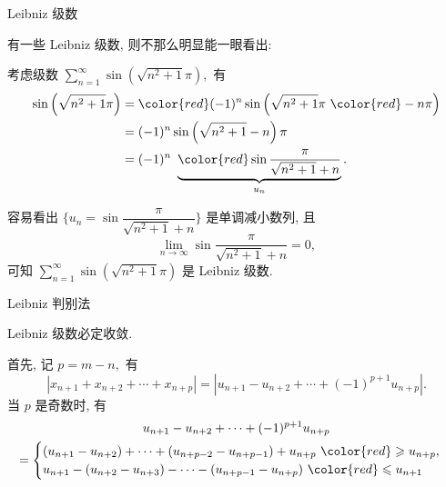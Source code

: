 
\begin{frame}{Leibniz 级数}

有一些 Leibniz 级数, 则不那么明显能一眼看出:

\pause
\vspace{0.5em}

考虑级数 $\sum\limits_{n=1}^\infty \sin \left( \sqrt{n^2+1} \pi \right),$ 有
\begin{align*}
\sin \left( \sqrt{n^2+1} \pi \right) & = {\color{red} (-1)^n} \sin \left( \sqrt{n^2+1} \pi ~ {\color{red} - n\pi} \right) \\
& = (-1)^n \sin \left( \sqrt{n^2+1} - n \right) \pi \\
& = (-1)^n ~ \underbrace{\color{red} \sin \dfrac{\pi}{\sqrt{n^2+1} + n}}_{u_n}.
\end{align*}

\pause

容易看出 $\{u_n = \sin \dfrac{\pi}{\sqrt{n^2+1} + n}\}$ 是单调减小数列, 且
\[\lim\limits_{n\to\infty} \sin \dfrac{\pi}{\sqrt{n^2+1} + n} = 0,\]
可知 $\sum\limits_{n=1}^\infty \sin \left( \sqrt{n^2+1} \pi \right)$ 是 Leibniz 级数.

\end{frame}


\begin{frame}{Leibniz 判别法}

\begin{thm}
\begin{center}
Leibniz 级数必定收敛.
\end{center}
\end{thm}

\pause
\vspace{0.5em}

\startproof[bg=yellow, fg=red]
首先, 记 $p = m - n,$ 有
\[\left\lvert x_{n+1} + x_{n+2} + \cdots + x_{n+p} \right\rvert = \left\lvert u_{n+1} - u_{n+2} + \cdots + (-1)^{p+1} u_{n+p} \right\rvert.\]
\pause
当 $p$ 是奇数时, 有
\begin{multline*}
u_{n+1} - u_{n+2} + \cdots + (-1)^{p+1} u_{n+p} \\
= \begin{cases}
(u_{n+1} - u_{n+2}) + \cdots + (u_{n+p-2} - u_{n+p-1}) + u_{n+p} ~ {\color{red} \geqslant u_{n+p}}, \\
u_{n+1} - (u_{n+2} - u_{n+3}) - \cdots - (u_{n+p-1} - u_{n+p}) ~ {\color{red} \leqslant u_{n+1}}
\end{cases}
\end{multline*}

\end{frame}

